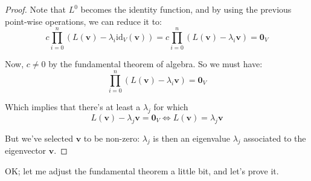 \documentclass[solutions.tex]{subfiles}
\renewcommand{\bm}[1]{\pmb{#1}}
\begin{document}
\begin{proof}
Note that $L^0$ becomes the identity function, and by using
the previous point-wise operations, we can reduce it to:
\[
	c\prod_{i=0}^n (L(\bm{v})-\lambda_i\text{id}_V(\bm{v})) =
	c\prod_{i=0}^n (L(\bm{v})-\lambda_i\bm{v})
		= \bm{0}_V
\]

Now, $c\neq 0$ by the fundamental theorem of algebra. So
we must have:
\[
	\prod_{i=0}^n (L(\bm{v})-\lambda_i\bm{v}) = \bm{0}_V
\]

Which implies that there's at least a $\lambda_j$ for which
\[
	L(\bm{v})-\lambda_j\bm{v} = \bm{0}_V
	\Leftrightarrow L(\bm{v}) = \lambda_j\bm{v}
\]

But we've selected $\bm{v}$ to be non-zero: $\lambda_j$
is then an eigenvalue $\lambda_j$ associated to the
eigenvector $\bm{v}$.

\end{proof}

OK; let me adjust the fundamental theorem a little bit, and let's
prove it.
\end{document}
